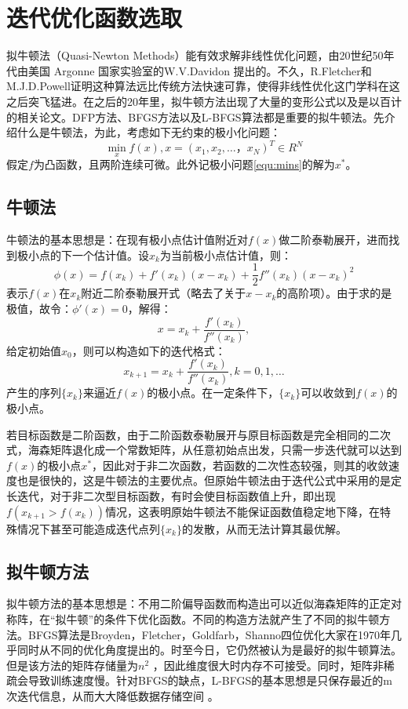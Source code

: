 \documentclass[oneside]{ZJUthesis}
\begin{document}
\section{迭代优化函数选取}
拟牛顿法（Quasi-Newton Methods）能有效求解非线性优化问题，由20世纪50年代由美国 Argonne 国家实验室的W.V.Davidon 提出的。不久，R.Fletcher和M.J.D.Powell证明这种算法远比传统方法快速可靠，使得非线性优化这门学科在这之后突飞猛进。在之后的20年里，拟牛顿方法出现了大量的变形公式以及是以百计的相关论文\cite{陈姗2013求解无约束最优化问题的一个新的拟牛顿方法}。DFP方法、BFGS方法以及L-BFGS算法都是重要的拟牛顿法。先介绍什么是牛顿法，为此，考虑如下无约束的极小化问题：
\begin{equation}
	\label{equ:mins}
	\min_{x}{f(x)},x=(x_1,x_2,\dots，x_N )^T \in R^N 
\end{equation}
假定$f$为凸函数，且两阶连续可微。此外记极小问题\ref{equ:mins}的解为$x^*$。
\subsection{牛顿法}
牛顿法的基本思想是：在现有极小点估计值附近对$f(x)$做二阶泰勒展开，进而找到极小点的下一个估计值。设$x_k$为当前极小点估计值，则：
\begin{equation}
	\phi(x)=f(x_k )+f'(x_k )(x-x_k )+\frac{1}{2}f''(x_k )(x-x_k )^2
\end{equation}
表示$f(x)$在$x_k$附近二阶泰勒展开式（略去了关于$x-x_k $的高阶项）。由于求的是极值，故令：$\phi '(x)=0$，解得：
\begin{equation}
	x=x_k +\frac{f'(x_k )}{f''(x_k )},
\end{equation}
给定初始值$x_0 $，则可以构造如下的迭代格式：
\begin{equation}
	x_{k+1 }=x_k +\frac{f'(x_k )}{f''(x_k )},k=0,1,\dots
\end{equation}
产生的序列$\{x_k \}$来逼近$f(x)$的极小点。在一定条件下，$\{x_k \}$可以收敛到$f(x)$的极小点。

若目标函数是二阶函数，由于二阶函数泰勒展开与原目标函数是完全相同的二次式，海森矩阵退化成一个常数矩阵，从任意初始点出发，只需一步迭代就可以达到$f(x)$的极小点$x^*$，因此对于非二次函数，若函数的二次性态较强，则其的收敛速度也是很快的，这是牛顿法的主要优点。但原始牛顿法由于迭代公式中采用的是定长迭代，对于非二次型目标函数，有时会使目标函数值上升，即出现$f(x_{k+1 }>f(x_k ))$情况，这表明原始牛顿法不能保证函数值稳定地下降，在特殊情况下甚至可能造成迭代点列$\{x_k\}$的发散，从而无法计算其最优解。
\subsection{拟牛顿方法}
拟牛顿方法的基本思想是：不用二阶偏导函数而构造出可以近似海森矩阵的正定对称阵，在``拟牛顿''的条件下优化函数。不同的构造方法就产生了不同的拟牛顿方法。BFGS算法是Broyden，Fletcher，Goldfarb，Shanno四位优化大家在1970年几乎同时从不同的优化角度提出的。时至今日，它仍然被认为是最好的拟牛顿算法。但是该方法的矩阵存储量为$n^2$ ，因此维度很大时内存不可接受。同时，矩阵非稀疏会导致训练速度慢。针对BFGS的缺点，L-BFGS的基本思想是只保存最近的m次迭代信息，从而大大降低数据存储空间 。
\end{document}
